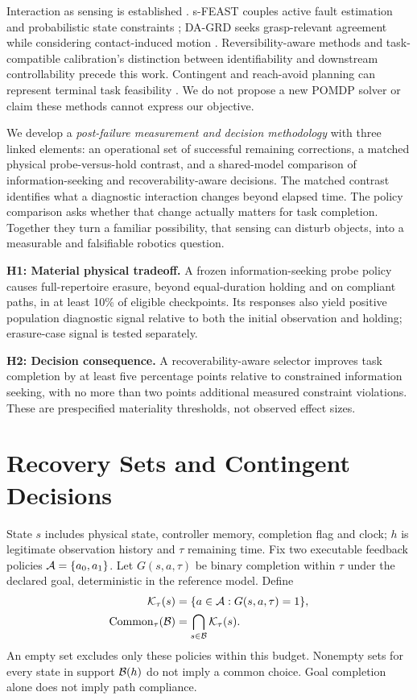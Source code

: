 Interaction as sensing is established \citep{bohg2017}. s-FEAST couples active fault estimation and probabilistic state constraints \citep{ragan2024}; DA-GRD seeks grasp-relevant agreement while considering contact-induced motion \citep{wang2026}. Reversibility-aware methods \citep{eysenbach2018,grinsztajn2021} and task-compatible calibration's distinction between identifiability and downstream controllability \citep{kobayashi2026} precede this work. Contingent and reach-avoid planning can represent terminal task feasibility \citep{sheng2024}. We do not propose a new POMDP solver or claim these methods cannot express our objective.

We develop a \emph{post-failure measurement and decision methodology} with three linked elements: an operational set of successful remaining corrections, a matched physical probe-versus-hold contrast, and a shared-model comparison of information-seeking and recoverability-aware decisions. The matched contrast identifies what a diagnostic interaction changes beyond elapsed time. The policy comparison asks whether that change actually matters for task completion. Together they turn a familiar possibility, that sensing can disturb objects, into a measurable and falsifiable robotics question.

\textbf{H1: Material physical tradeoff.} A frozen information-seeking probe policy causes full-repertoire erasure, beyond equal-duration holding and on compliant paths, in at least 10\% of eligible checkpoints. Its responses also yield positive population diagnostic signal relative to both the initial observation and holding; erasure-case signal is tested separately.

\textbf{H2: Decision consequence.} A recoverability-aware selector improves task completion by at least five percentage points relative to constrained information seeking, with no more than two points additional measured constraint violations. These are prespecified materiality thresholds, not observed effect sizes.

\section{Recovery Sets and Contingent Decisions}
State $s$ includes physical state, controller memory, completion flag and clock; $h$ is legitimate observation history and $\tau$ remaining time. Fix two executable feedback policies $\mathcal A=\{a_0,a_1\}$. Let $G(s,a,\tau)$ be binary completion within $\tau$ under the declared goal, deterministic in the reference model. Define
\begin{equation}
\begin{split}
\mathcal K_\tau(s)&=\{a\in\mathcal A:G(s,a,\tau)=1\},\\
\operatorname{Common}_\tau(\mathcal B)&=\bigcap_{s\in\mathcal B}\mathcal K_\tau(s).
\end{split}
\label{eq:sets}
\end{equation}
An empty set excludes only these policies within this budget. Nonempty sets for every state in support $\mathcal B(h)$ do not imply a common choice. Goal completion alone does not imply path compliance.

